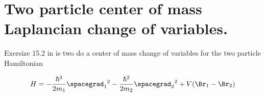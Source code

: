 

\chapter{Two particle center of mass Laplancian change of variables.}
\label{chap:twoParticleCMLaplacian}
{}
\date{Nov 30, 2009}

\beginArtWithToc

Exersize 15.2 in \cite{bohm1989qt} is two do a center of mass change of variables for the two particle Hamiltonian

\begin{align}\label{eqn:bohm15:2:em1}
H = 
- \frac{\hbar^2}{2 m_1} {\spacegrad_1}^2
- \frac{\hbar^2}{2 m_2} {\spacegrad_2}^2
+ V(\Br_1 -\Br_2)
\end{align}



\EndArticle
